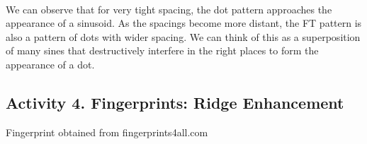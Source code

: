 \documentclass[11pt]{article}
\begin{document}
    \begin{center}
    \end{center}
    { \hspace*{\fill} \\}
    
    We can observe that for very tight spacing, the dot pattern approaches
the appearance of a sinusoid. As the spacings become more distant, the
FT pattern is also a pattern of dots with wider spacing. We can think of
this as a superposition of many sines that destructively interfere in
the right places to form the appearance of a dot.

    \hypertarget{activity-4.-fingerprints-ridge-enhancement}{%
\subsection{Activity 4. Fingerprints: Ridge
Enhancement}\label{activity-4.-fingerprints-ridge-enhancement}}

Fingerprint obtained from fingerprints4all.com
\end{document}
